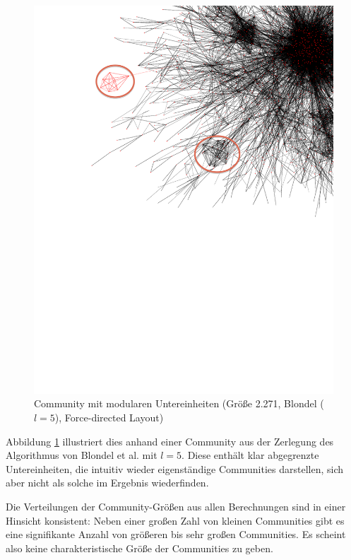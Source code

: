 \begin{figure}[ht!]
  \centering
  \includegraphics[scale=0.7]{images/blondel-l5-com-c3a5eaab680984b123037897b0be74bf-edit.pdf}
  \caption{Community mit modularen Untereinheiten (Größe 2.271,
    Blondel ($l=5$), Force-directed Layout)}
  \label{fig:large-modular}
\end{figure}

Abbildung \ref{fig:large-modular} illustriert dies anhand einer
Community aus der Zerlegung des Algorithmus von Blondel et al. mit
$l=5$. Diese enthält klar abgegrenzte Untereinheiten, die intuitiv
wieder eigenständige Communities darstellen, sich aber nicht als
solche im Ergebnis wiederfinden.

Die Verteilungen der Community-Größen aus allen Berechnungen sind
in einer Hinsicht konsistent: Neben einer großen Zahl von kleinen
Communities gibt es eine signifikante Anzahl von größeren bis sehr
großen Communities. Es scheint also keine charakteristische Größe
der Communities zu geben.

